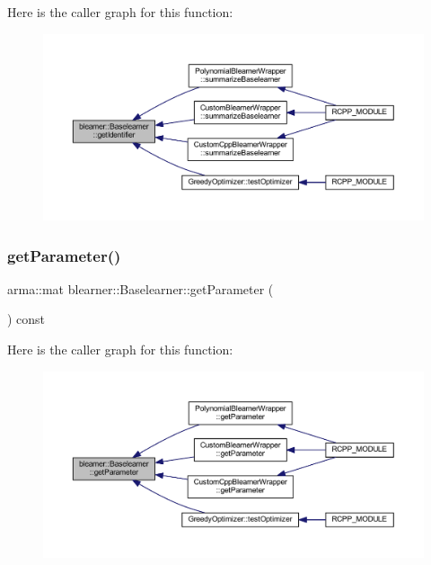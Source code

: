 Here is the caller graph for this function\+:\nopagebreak
\begin{figure}[H]
\begin{center}
\leavevmode
\includegraphics[width=350pt]{classblearner_1_1_baselearner_aa10fa4301aeb37f6e8c18457541c3be7_icgraph}
\end{center}
\end{figure}
\mbox{\label{classblearner_1_1_baselearner_a3362fe72e1b653ec3664cae2397414ed}} 
\subsubsection{\texorpdfstring{get\+Parameter()}{getParameter()}}
{\footnotesize\ttfamily arma\+::mat blearner\+::\+Baselearner\+::get\+Parameter (\begin{DoxyParamCaption}{ }\end{DoxyParamCaption}) const}

Here is the caller graph for this function\+:\nopagebreak
\begin{figure}[H]
\begin{center}
\leavevmode
\includegraphics[width=350pt]{classblearner_1_1_baselearner_a3362fe72e1b653ec3664cae2397414ed_icgraph}
\end{center}
\end{figure}
\mbox{\label{classblearner_1_1_baselearner_af01f1b8c4540927705ff79c3649489f7}} 
